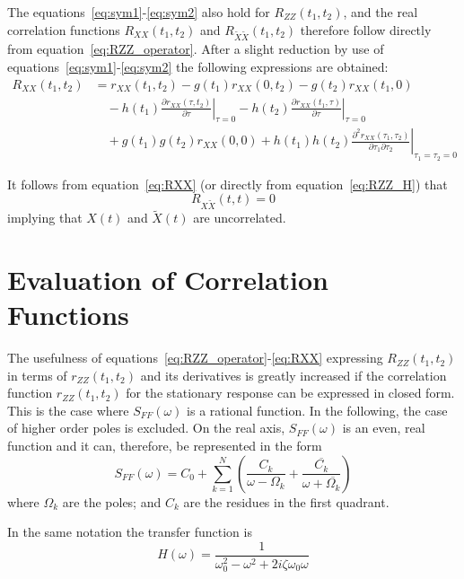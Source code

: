 \documentclass[12pt]{article}
\begin{document}
The equations~\eqref{eq:sym1}-\eqref{eq:sym2} also hold for $R_{ZZ}(t_1, t_2)$, and the real correlation functions $R_{XX}(t_1, t_2)$ and $R_{\tilde{X}\tilde{X}}(t_1, t_2)$ therefore follow directly from equation~\eqref{eq:RZZ_operator}. After a slight reduction by use of equations~\eqref{eq:sym1}-\eqref{eq:sym2} the following expressions are obtained:
\begin{align}
    R_{XX}(t_1, t_2) &= r_{XX}(t_1, t_2) - g(t_1) r_{XX}(0, t_2) - g(t_2) r_{XX}(t_1, 0) \nonumber \\
    &\quad - h(t_1) \left. \frac{\partial r_{XX}(\tau, t_2)}{\partial \tau} \right|_{\tau=0} - h(t_2) \left. \frac{\partial r_{XX}(t_1, \tau)}{\partial \tau} \right|_{\tau=0} \nonumber \\
    &\quad + g(t_1) g(t_2) r_{XX}(0, 0) + h(t_1) h(t_2) \left. \frac{\partial^2 r_{XX}(\tau_1, \tau_2)}{\partial \tau_1 \partial \tau_2} \right|_{\tau_1=\tau_2=0}
    \label{eq:RXX}
\end{align}

It follows from equation~\eqref{eq:RXX} (or directly from equation~\eqref{eq:RZZ_H}) that
\begin{equation}
    R_{X\tilde{X}}(t, t) = 0
    \label{eq:uncorrelated}
\end{equation}
implying that $X(t)$ and $\tilde{X}(t)$ are uncorrelated.

\section{Evaluation of Correlation Functions}

The usefulness of equations~\eqref{eq:RZZ_operator}-\eqref{eq:RXX} expressing $R_{ZZ}(t_1, t_2)$ in terms of $r_{ZZ}(t_1, t_2)$ and its derivatives is greatly increased if the correlation function $r_{ZZ}(t_1, t_2)$ for the stationary response can be expressed in closed form. This is the case where $S_{FF}(\omega)$ is a rational function. In the following, the case of higher order poles is excluded. On the real axis, $S_{FF}(\omega)$ is an even, real function and it can, therefore, be represented in the form
\begin{equation}
    S_{FF}(\omega) = C_0 + \sum_{k=1}^N \left( \frac{C_k}{\omega - \Omega_k} + \frac{\overline{C_k}}{\omega + \overline{\Omega_k}} \right)
    \label{eq:SFF_rational}
\end{equation}
where $\Omega_k$ are the poles; and $C_k$ are the residues in the first quadrant.

In the same notation the transfer function is
\begin{equation}
    H(\omega) = \frac{1}{\omega_0^2 - \omega^2 + 2i\zeta\omega_0\omega}
    \label{eq:H_rational}
\end{equation}
\end{document}
